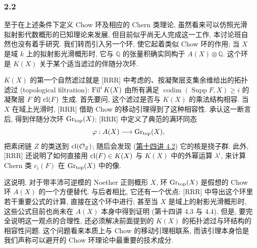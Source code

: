 \subsubsection*{2.2}
至于在上述条件下定义 Chow 环及相应的 Chern 类理论, 虽然看来可以仿照光滑拟射影代数概形的已知理论来发展, 但目前似乎尚无人完成这一工作, 本讨论班自然也没有着手研究. 我们转而引入另一个环, 使它起着类似 Chow 环的作用; 当 $X$ 是域 $k$ 上的拟射影光滑概形时, 它与 $\mathbb Q$ 的张量积确实同构于 $A(X)\otimes\mathbb Q$. 这个环是 $K(X)$ 关于某个适当滤过的伴随分次环.

$K(X)$ 的第一个自然滤过就是 [RRR] 中考虑的、按凝聚层支集余维给出的拓扑滤过 (topological filtration): $\operatorname{Fil}^iK(X)$ 由所有满足 $\operatorname{codim}(\operatorname{Supp}F,X)\ge i$ 的凝聚层 $F$ 的 $\operatorname{cl}(F)$ 生成. 首先要问, 这个滤过是否与 $K(X)$ 的乘法结构相容. 当 $X$ 在域上光滑时, [RRR] 借助 Chow 的移动引理得到了这种相容性. 承认这一断言后, 得到伴随分次环 $\operatorname{Gr}_{\mathrm{top}}(X)$; [RRR] 中定义了典范的满环同态
\[
\varphi:A(X)\longrightarrow \operatorname{Gr}_{\mathrm{top}}(X),
\]
把素闭链 $Z$ 的类送到 $\operatorname{cl}(\mathcal O_Z)$; 随后会发现 (\hyperlink{sga6.e14.para.4-2}{第十四讲 4.2}) 它的核是挠子群. 此外, [RRR] 还说明了如何直接用 $\operatorname{cl}(F)\in K(X)$ 与 $K(X)$ 中的外幂运算 $\lambda^i$, 来计算 Chern 类 $c_i(F)$ 在 $\operatorname{Gr}_{\mathrm{top}}(X)$ 中的像.

这说明, 对于带丰沛可逆模的 Noether 正则概形 $X$, 环 $\operatorname{Gr}_{\mathrm{top}}(X)$ 是假想的 Chow 环 $A(X)$ 的一个方便替代. 与后者相比, 它还有一个优点: [RRR] 中导出这个环里若干重要公式的计算, 直接在这个环中进行; 甚至当 $X$ 是域上的射影光滑概形时, 这些公式目前也尚未在 $A(X)$ 本身中得到证明 (第十四讲 4.3 与 4.4). 但是, 要完全说明这一观点的合理性, 还必须解决前面提到的 $K(X)$ 的拓扑滤过与环结构的相容性问题. 这个问题看来本质上与 Chow 的移动引理相联系, 而该引理本身恰是我们声称可以避开的 Chow 环理论中最重要的技术成分.

